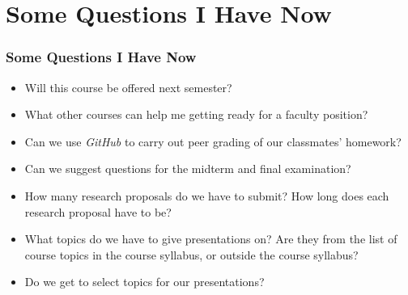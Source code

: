 \documentclass[xcolor={usenames,dvipsnames},hyperref={hyperindex,bookmarks}]{beamer}
\begin{document}
\section{Some Questions I Have Now}

\frame
{
	\frametitle{Some Questions I Have Now}

	\begin{itemize}
	\item Will this course be offered next semester?
	\item What other courses can help me getting ready for a faculty position?
	\item Can we use {\it GitHub} to carry out peer grading of our classmates' homework?
	\item Can we suggest questions for the midterm and final examination?
	\item How many research proposals do we have to submit? How long does each research proposal have to be?
	\item What topics do we have to give presentations on? Are they from the list of course topics in the course syllabus, or outside the course syllabus?
	\item Do we get to select topics for our presentations?
	\end{itemize}
}












%
%
%
%
%	
%	
\end{document}
